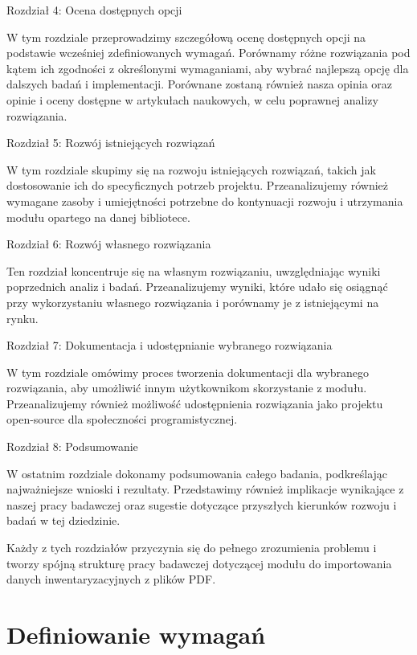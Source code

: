 \documentclass[a4paper,twoside,12pt]{book}
\begin{document}
Rozdział 4: Ocena dostępnych opcji

W tym rozdziale przeprowadzimy szczegółową ocenę dostępnych opcji na podstawie wcześniej zdefiniowanych wymagań. Porównamy różne rozwiązania pod kątem ich zgodności z określonymi wymaganiami, aby wybrać najlepszą opcję dla dalszych badań i implementacji. Porównane zostaną również nasza opinia oraz opinie i oceny dostępne w artykułach naukowych, w celu poprawnej analizy rozwiązania.

Rozdział 5: Rozwój istniejących rozwiązań

W tym rozdziale skupimy się na rozwoju istniejących rozwiązań, takich jak dostosowanie ich do specyficznych potrzeb  projektu. Przeanalizujemy również wymagane zasoby i umiejętności potrzebne do kontynuacji rozwoju i utrzymania modułu opartego na danej bibliotece.

Rozdział 6: Rozwój własnego rozwiązania

Ten rozdział koncentruje się na własnym rozwiązaniu, uwzględniając wyniki poprzednich analiz i badań. Przeanalizujemy wyniki, które udało się osiągnąć przy wykorzystaniu własnego rozwiązania i porównamy je z istniejącymi na rynku.

Rozdział 7: Dokumentacja i udostępnianie wybranego rozwiązania

W tym rozdziale omówimy proces tworzenia dokumentacji dla wybranego rozwiązania, aby umożliwić innym użytkownikom skorzystanie z modułu. Przeanalizujemy również możliwość udostępnienia rozwiązania jako projektu open-source dla społeczności programistycznej.

Rozdział 8: Podsumowanie

W ostatnim rozdziale dokonamy podsumowania całego badania, podkreślając najważniejsze wnioski i rezultaty. Przedstawimy również implikacje wynikające z naszej pracy badawczej oraz sugestie dotyczące przyszłych kierunków rozwoju i badań w tej dziedzinie.

Każdy z tych rozdziałów przyczynia się do pełnego zrozumienia problemu i tworzy spójną strukturę pracy badawczej dotyczącej modułu do importowania danych inwentaryzacyjnych z plików PDF.


\chapter{Definiowanie wymagań}  %
% 

\end{document}
